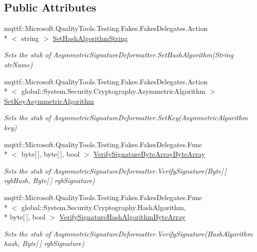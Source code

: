 \subsection*{Public Attributes}
\begin{DoxyCompactItemize}
\item 
mqttf\-::\-Microsoft.\-Quality\-Tools.\-Testing.\-Fakes.\-Fakes\-Delegates.\-Action\\*
$<$ string $>$ \hyperlink{class_system_1_1_security_1_1_cryptography_1_1_fakes_1_1_stub_asymmetric_signature_deformatter_af41cbf3f222b11019984b661380eaee6}{Set\-Hash\-Algorithm\-String}
\begin{DoxyCompactList}\small\item\em Sets the stub of Asymmetric\-Signature\-Deformatter.\-Set\-Hash\-Algorithm(\-String str\-Name)\end{DoxyCompactList}\item 
mqttf\-::\-Microsoft.\-Quality\-Tools.\-Testing.\-Fakes.\-Fakes\-Delegates.\-Action\\*
$<$ global\-::\-System.\-Security.\-Cryptography.\-Asymmetric\-Algorithm $>$ \hyperlink{class_system_1_1_security_1_1_cryptography_1_1_fakes_1_1_stub_asymmetric_signature_deformatter_af28c35799234bb8f92a741c8d519a4e9}{Set\-Key\-Asymmetric\-Algorithm}
\begin{DoxyCompactList}\small\item\em Sets the stub of Asymmetric\-Signature\-Deformatter.\-Set\-Key(\-Asymmetric\-Algorithm key)\end{DoxyCompactList}\item 
mqttf\-::\-Microsoft.\-Quality\-Tools.\-Testing.\-Fakes.\-Fakes\-Delegates.\-Func\\*
$<$ byte\mbox{[}$\,$\mbox{]}, byte\mbox{[}$\,$\mbox{]}, bool $>$ \hyperlink{class_system_1_1_security_1_1_cryptography_1_1_fakes_1_1_stub_asymmetric_signature_deformatter_a89c955e67d65dc4b888b41633168e417}{Verify\-Signature\-Byte\-Array\-Byte\-Array}
\begin{DoxyCompactList}\small\item\em Sets the stub of Asymmetric\-Signature\-Deformatter.\-Verify\-Signature(\-Byte\mbox{[}$\,$\mbox{]} rgb\-Hash, Byte\mbox{[}$\,$\mbox{]} rgb\-Signature)\end{DoxyCompactList}\item 
mqttf\-::\-Microsoft.\-Quality\-Tools.\-Testing.\-Fakes.\-Fakes\-Delegates.\-Func\\*
$<$ global\-::\-System.\-Security.\-Cryptography.\-Hash\-Algorithm, \\*
byte\mbox{[}$\,$\mbox{]}, bool $>$ \hyperlink{class_system_1_1_security_1_1_cryptography_1_1_fakes_1_1_stub_asymmetric_signature_deformatter_ab73714f51a7d63d7948d299f5d416e42}{Verify\-Signature\-Hash\-Algorithm\-Byte\-Array}
\begin{DoxyCompactList}\small\item\em Sets the stub of Asymmetric\-Signature\-Deformatter.\-Verify\-Signature(\-Hash\-Algorithm hash, Byte\mbox{[}$\,$\mbox{]} rgb\-Signature)\end{DoxyCompactList}\end{DoxyCompactItemize}
